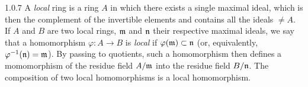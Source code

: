 \documentclass[../main.tex]{subfiles}
\begin{document}
\begin{cx}{1.0.7}
A \emph{local} ring is a ring $A$ in which there exists a single maximal ideal, which is then
the complement of the invertible elements and contains all the ideals $\neq A$. If $A$ and $B$
are two local rings, $\mathfrak{m}$ and $\mathfrak{n}$ their respective maximal ideals, we say that a
homomorphism $\varphi:A\to B$ is \emph{local} if $\varphi(\mathfrak{m})\subset\mathfrak{n}$ (or, equivalently,
$\varphi^{-1}(\mathfrak{n})=\mathfrak{m}$). By passing to quotients, such a homomorphism then defines
a momomorphism of the residue field $A/\mathfrak{m}$ into the residue field $B/\mathfrak{n}$. The
composition of two local homomorphisms is a local homomorphism.
\end{cx}
\end{document}
